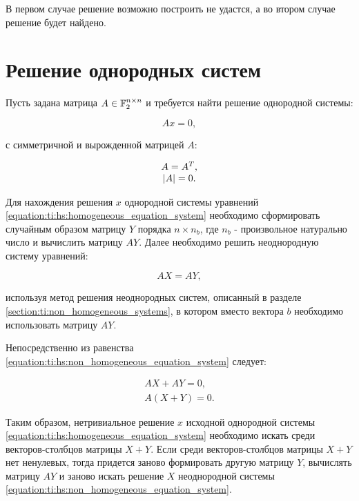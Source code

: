В первом случае решение возможно построить не удастся, а во втором случае решение будет найдено.

\section{Решение однородных систем} \label{section:ti:homogeneous_systems}

Пусть задана матрица $A \in \mathbb{F}^{n \times n}_2$ и требуется найти решение однородной системы:

\begin{equation} \label{equation:ti:hs:homogeneous_equation_system}
	Ax = 0,
\end{equation}

с симметричной и вырожденной матрицей $A$:

$$
	\begin{array}{c}
		A = A^T, \\
		\left | A \right | = 0.
	\end{array}
$$

Для нахождения решения $x$ однородной системы уравнений \ref{equation:ti:hs:homogeneous_equation_system} необходимо сформировать случайным образом матрицу
$Y$ порядка $n \times n_b$, где $n_b$ - произвольное натурально число и вычислить матрицу $AY$. Далее необходимо решить неоднородную систему уравнений:

\begin{equation} \label{equation:ti:hs:non_homogeneous_equation_system}
	AX = AY,
\end{equation}

используя метод решения неоднородных систем, описанный в разделе \ref{section:ti:non_homogeneous_systems}, в котором вместо вектора $b$
необходимо использовать матрицу $AY$.

Непосредственно из равенства \ref{equation:ti:hs:non_homogeneous_equation_system} следует:

$$
	\begin{array}{c}
		AX + AY = 0, \\
		A \left ( X + Y \right ) = 0.
	\end{array}
$$

Таким образом, нетривиальное решение $x$ исходной однородной системы \ref{equation:ti:hs:homogeneous_equation_system} необходимо искать среди
векторов-столбцов матрицы $X+Y$. Если среди векторов-столбцов матрицы $X+Y$ нет ненулевых, тогда придется заново формировать другую матрицу $Y$,
вычислять матрицу $AY$ и заново искать решение $X$ неоднородной системы \ref{equation:ti:hs:non_homogeneous_equation_system}.

